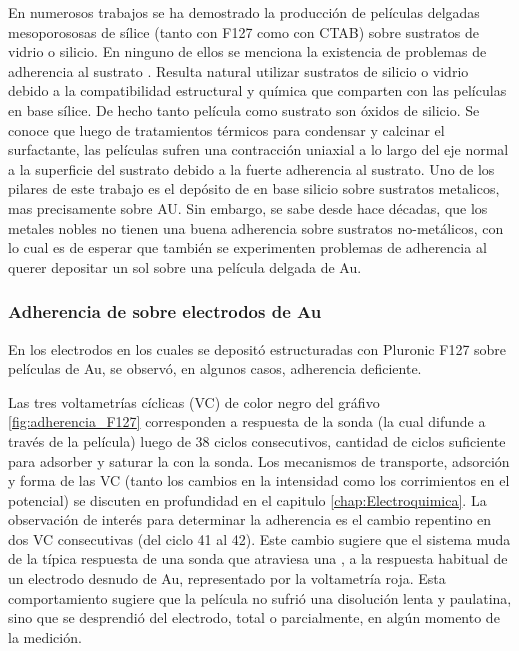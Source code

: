 		 En numerosos trabajos se ha demostrado la producción de películas delgadas mesoporososas de sílice (tanto con F127 como con CTAB) sobre sustratos de vidrio o silicio. En ninguno de ellos se menciona la existencia de problemas de adherencia al sustrato \cite{Angelome2008,Fuertes2010,Violi2015}. Resulta natural utilizar sustratos de silicio o vidrio debido a la compatibilidad estructural y química que comparten con las películas en base sílice. De hecho tanto película como sustrato son óxidos de silicio. Se conoce que luego de tratamientos térmicos para condensar y calcinar el surfactante, las películas sufren una contracción uniaxial a lo largo del eje normal a la superficie del sustrato debido a la fuerte adherencia al sustrato.\cite{Grosso2004,Soler-Illia2012,Chougnet2005} Uno de los pilares de este trabajo es el depósito de \pdm\space en base silicio sobre sustratos metalicos, mas precisamente sobre AU. Sin embargo, se sabe desde hace décadas, que los metales nobles no tienen una buena adherencia sobre sustratos no-metálicos\cite{Kern1990,Hieber1976}, con lo cual es de esperar que también se experimenten problemas de adherencia al querer depositar un sol sobre una película delgada de Au. \cite{Meyer2004,Nugen2009,nasa1973}

		\subsubsection{Adherencia de \pdm\space sobre electrodos de Au}

			En los electrodos en los cuales se depositó \pdm\space estructuradas con Pluronic F127 sobre películas de Au, se observó, en algunos casos, adherencia deficiente. 
			
			Las tres voltametrías cíclicas (VC) de color negro del gráfivo \ref{fig:adherencia_F127} corresponden a respuesta de la sonda \aminorutenio (la cual difunde a través de la película) luego de 38 ciclos consecutivos, cantidad de ciclos suficiente para adsorber y saturar la \pdm\space con la sonda. Los mecanismos de transporte, adsorción y forma de las VC (tanto los cambios en la intensidad como los corrimientos en el potencial) se discuten en profundidad en el capitulo \ref{chap:Electroquimica}. La observación de interés para determinar la adherencia es el cambio repentino en dos VC consecutivas (del ciclo 41 al 42). Este cambio sugiere que el sistema muda de la típica respuesta de una sonda que atraviesa una \pdm, a la respuesta habitual de un electrodo desnudo de Au, representado por la voltametría roja. Esta comportamiento sugiere que la película no sufrió una disolución lenta y paulatina, sino que se desprendió del electrodo, total o parcialmente, en algún momento de la medición.
			
